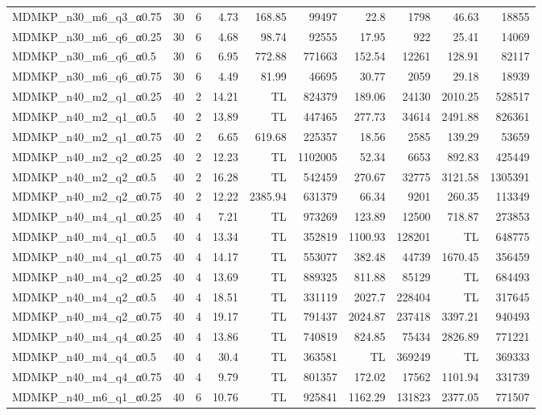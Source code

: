 \begin{center}
\begin{scriptsize}
\begin{longtable}{lrrrrrrrrr}
MDMKP\_n30\_m6\_q3\_α0.75 & 30 & 6 & 4.73 & 168.85 & 99497 & 22.8 & 1798 & 46.63 & 18855\\
MDMKP\_n30\_m6\_q6\_α0.25 & 30 & 6 & 4.68 & 98.74 & 92555 & 17.95 & 922 & 25.41 & 14069\\
MDMKP\_n30\_m6\_q6\_α0.5 & 30 & 6 & 6.95 & 772.88 & 771663 & 152.54 & 12261 & 128.91 & 82117\\
MDMKP\_n30\_m6\_q6\_α0.75 & 30 & 6 & 4.49 & 81.99 & 46695 & 30.77 & 2059 & 29.18 & 18939\\
MDMKP\_n40\_m2\_q1\_α0.25 & 40 & 2 & 14.21 &  TL & 824379 & 189.06 & 24130 & 2010.25 & 528517\\
MDMKP\_n40\_m2\_q1\_α0.5 & 40 & 2 & 13.89 &  TL & 447465 & 277.73 & 34614 & 2491.88 & 826361\\
MDMKP\_n40\_m2\_q1\_α0.75 & 40 & 2 & 6.65 & 619.68 & 225357 & 18.56 & 2585 & 139.29 & 53659\\
MDMKP\_n40\_m2\_q2\_α0.25 & 40 & 2 & 12.23 &  TL & 1102005 & 52.34 & 6653 & 892.83 & 425449\\
MDMKP\_n40\_m2\_q2\_α0.5 & 40 & 2 & 16.28 &  TL & 542459 & 270.67 & 32775 & 3121.58 & 1305391\\
MDMKP\_n40\_m2\_q2\_α0.75 & 40 & 2 & 12.22 & 2385.94 & 631379 & 66.34 & 9201 & 260.35 & 113349\\
MDMKP\_n40\_m4\_q1\_α0.25 & 40 & 4 & 7.21 &  TL & 973269 & 123.89 & 12500 & 718.87 & 273853\\
MDMKP\_n40\_m4\_q1\_α0.5 & 40 & 4 & 13.34 &  TL & 352819 & 1100.93 & 128201 &  TL & 648775\\
MDMKP\_n40\_m4\_q1\_α0.75 & 40 & 4 & 14.17 &  TL & 553077 & 382.48 & 44739 & 1670.45 & 356459\\
MDMKP\_n40\_m4\_q2\_α0.25 & 40 & 4 & 13.69 &  TL & 889325 & 811.88 & 85129 &  TL & 684493\\
MDMKP\_n40\_m4\_q2\_α0.5 & 40 & 4 & 18.51 &  TL & 331119 & 2027.7 & 228404 &  TL & 317645\\
MDMKP\_n40\_m4\_q2\_α0.75 & 40 & 4 & 19.17 &  TL & 791437 & 2024.87 & 237418 & 3397.21 & 940493\\
MDMKP\_n40\_m4\_q4\_α0.25 & 40 & 4 & 13.86 &  TL & 740819 & 824.85 & 75434 & 2826.89 & 771221\\
MDMKP\_n40\_m4\_q4\_α0.5 & 40 & 4 & 30.4 &  TL & 363581 &  TL & 369249 &  TL & 369333\\
MDMKP\_n40\_m4\_q4\_α0.75 & 40 & 4 & 9.79 &  TL & 801357 & 172.02 & 17562 & 1101.94 & 331739\\
MDMKP\_n40\_m6\_q1\_α0.25 & 40 & 6 & 10.76 &  TL & 925841 & 1162.29 & 131823 & 2377.05 & 771507\\

\end{longtable}
\end{scriptsize}
\end{center}
